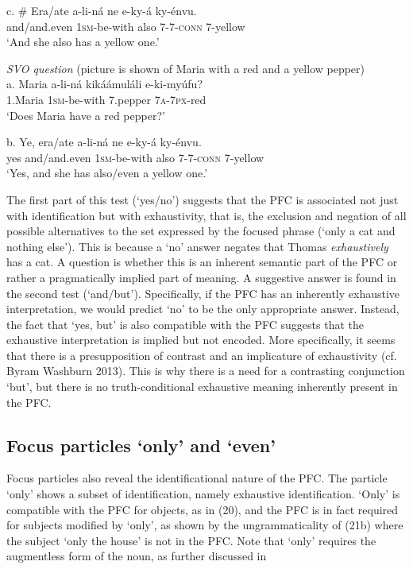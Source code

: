 \documentclass[output=paper]{langsci/langscibook}
\begin{document}
\ea
\gll   c.  \# Era/ate  a-li-ná  ne  e-ky-á    ky-énvu.\\
         and/and.even  \textsc{1sm}-be-with  also  \textsc{7}-\textsc{7}-\textsc{conn}  7-yellow\\
\glt     ‘And she also has a yellow one.’
\z

\ea
{\textit{SVO question}}
       (picture is shown of Maria with a red and a yellow pepper)\\
\gll   a.  Maria    a-li-ná  kikáámuláli  e-ki-myúfu?\\
         1.Maria  \textsc{1sm}-be-with  7.pepper  \textsc{7a}-\textsc{7px}-red\\
\glt     ‘Does Maria have a red pepper?’
\z

\ea
\gll   b.  Ye,  era/ate  a-li-ná  ne  e-ky-á    ky-énvu.\\
         yes  and/and.even  \textsc{1sm}-be-with  also  \textsc{7}-\textsc{7}-\textsc{conn}  7-yellow\\
\glt     ‘Yes, and she has also/even a yellow one.’
\z

The first part of this test (‘yes/no’) suggests that the PFC is associated not just with identification but with exhaustivity, that is, the exclusion and negation of all possible alternatives to the set expressed by the focused phrase (‘only a cat and nothing else’). This is because a ‘no’ answer negates that Thomas \textit{exhaustively} has a cat. A question is whether this is an inherent semantic part of the PFC or rather a pragmatically implied part of meaning. A suggestive answer is found in the second test (‘and/but’). Specifically, if the PFC has an inherently exhaustive interpretation, we would predict ‘no’ to be the only appropriate answer. Instead, the fact that ‘yes, but’ is also compatible with the PFC suggests that the exhaustive interpretation is implied but not encoded. More specifically, it seems that there is a presupposition of contrast and an implicature of exhaustivity (cf. Byram Washburn 2013). This is why there is a need for a contrasting conjunction ‘but’, but there is no truth-conditional exhaustive meaning inherently present in the PFC. 

\subsection{Focus particles ‘only’ and ‘even’} %

Focus particles also reveal the identificational nature of the PFC. The particle ‘only’ shows a subset of identification, namely exhaustive identification. ‘Only’ is compatible with the PFC for objects, as in (20), and the PFC is in fact required for subjects modified by ‘only’, as shown by the ungrammaticality of (21b) where the subject ‘only the house’ is not in the PFC. Note that ‘only’ requires the augmentless form of the noun, as further discussed in 
\end{document}
